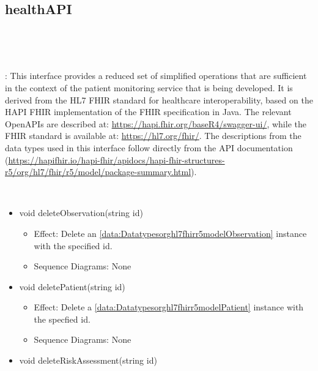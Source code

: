   \subsection{healthAPI}\label{int:InterfaceshealthAPI}
    \begin{description}
      \item[Provided by:] \iconcomponent{}~
      \item[Required by:] \iconcomponent{}~ 
           \item[Description]: This interface provides a reduced set of simplified operations that are sufficient in the context of the patient monitoring service that is being developed.
It is derived from the HL7 FHIR standard for healthcare interoperability, based on the HAPI FHIR implementation of the FHIR specification in Java. The relevant OpenAPIs are described at: \url{https://hapi.fhir.org/baseR4/swagger-ui/}, while the FHIR standard is available at: \url{https://hl7.org/fhir/}.
The descriptions from the data types used in this interface follow directly from the API documentation (\url{https://hapifhir.io/hapi-fhir/apidocs/hapi-fhir-structures-r5/org/hl7/fhir/r5/model/package-summary.html}).
      \item[Operations:] ~
    \begin{itemize}[noitemsep,nolistsep,leftmargin=-.25cm]
      \item \textsf{void deleteObservation(string id)}
        \begin{itemize}[noitemsep,nolistsep]
           \item Effect: Delete an \ref{data:Datatypesorghl7fhirr5modelObservation} instance with the specified id. 
           \item Sequence Diagrams: None
        \end{itemize}
      \item \textsf{void deletePatient(string id)}
        \begin{itemize}[noitemsep,nolistsep]
           \item Effect: Delete a \ref{data:Datatypesorghl7fhirr5modelPatient} instance with the specfied id. 
           \item Sequence Diagrams: None
        \end{itemize}
      \item \textsf{void deleteRiskAssessment(string id)}
        \begin{itemize}

\end{itemize}
\end{itemize}
\end{description}
